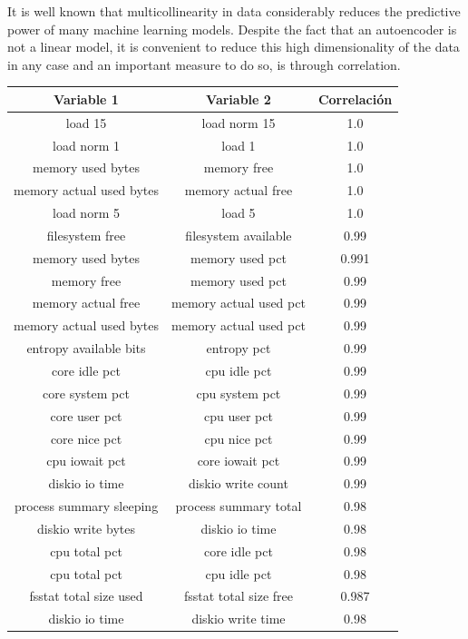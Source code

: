 \documentclass{iosart2c}
\begin{document}
It is well known that multicollinearity in data considerably reduces the predictive power of many machine learning models. Despite the fact that an autoencoder is not a linear model, it is convenient to reduce this high dimensionality of the data in any case and an important measure to do so, is through correlation. \\



\begin{table}[h!]
\begin{tabular}{ccc}
\hline
Variable 1 & Variable 2 & Correlación \\ \hline
load 15 & load norm 15 & 1.0\\ 
load norm 1 & load 1 & 1.0\\ 
memory used bytes & memory free & 1.0\\ 
memory actual used bytes & memory actual free & 1.0\\ 
load norm 5 & load 5 & 1.0\\ 
filesystem free & filesystem available & 0.99\\ 
memory used bytes & memory used pct & 0.991\\ 
memory free & memory used pct & 0.99\\ 
memory actual free & memory actual used pct & 0.99\\ 
memory actual used bytes & memory actual used pct & 0.99\\ 
entropy available bits & entropy pct & 0.99\\ 
core idle pct & cpu idle pct & 0.99\\ 
core system pct & cpu system pct & 0.99\\ 
core user pct & cpu user pct & 0.99\\ 
core nice pct & cpu nice pct & 0.99\\ 
cpu iowait pct & core iowait pct & 0.99\\ 
diskio io time & diskio write count & 0.99\\ 
process summary sleeping & process summary total & 0.98\\ 
diskio write bytes & diskio io time & 0.98\\ 
cpu total pct & core idle pct & 0.98\\ 
cpu total pct & cpu idle pct & 0.98\\ 
fsstat total size used & fsstat total size free & 0.987\\ 
diskio io time & diskio write time & 0.98\\ 

\end{tabular}
\end{table}
\end{document}
